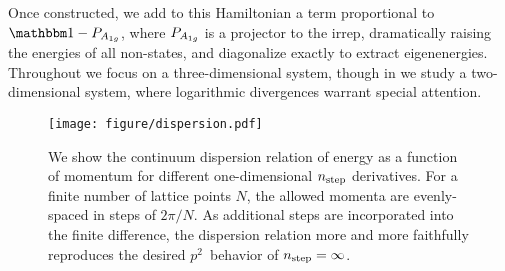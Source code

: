 Once constructed, we add to this Hamiltonian a term proportional to $\one-P_{\Aoneg}$, where $P_{A_{1g}}$ is a projector to the \Aoneg irrep, dramatically raising the energies of all non-\Aoneg states, and diagonalize exactly to extract \Aoneg eigenenergies.
Throughout we focus on a three-dimensional system, though in  we study a two-dimensional system, where logarithmic divergences warrant special attention.

\begin{figure}
    \texttt{[image: figure/dispersion.pdf]}
    \caption{We show the continuum dispersion relation of energy as a function of momentum for different one-dimensional ${n_\text{step}}$ derivatives.  For a finite number of lattice points $N$, the allowed momenta are evenly-spaced in steps of $2\pi/N$.
    As additional steps are incorporated into the finite difference, the dispersion relation more and more faithfully reproduces the desired $p^2$~behavior of ${n_\text{step}}=\infty$.
    }
    \label{fig:dispersion relation}
\end{figure}
